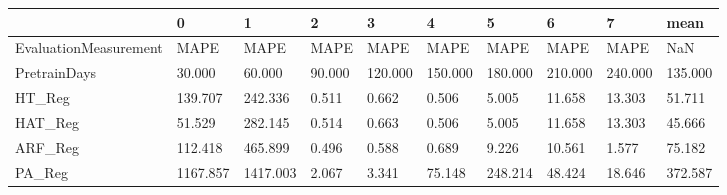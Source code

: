 \begin{tabular}{llllllllll}
\toprule
{} &        0 &        1 &      2 &       3 &       4 &       5 &       6 &       7 &    mean \\
\midrule
EvaluationMeasurement &     MAPE &     MAPE &   MAPE &    MAPE &    MAPE &    MAPE &    MAPE &    MAPE &     NaN \\
PretrainDays          &   30.000 &   60.000 & 90.000 & 120.000 & 150.000 & 180.000 & 210.000 & 240.000 & 135.000 \\
HT\_Reg                &  139.707 &  242.336 &  0.511 &   0.662 &   0.506 &   5.005 &  11.658 &  13.303 &  51.711 \\
HAT\_Reg               &   51.529 &  282.145 &  0.514 &   0.663 &   0.506 &   5.005 &  11.658 &  13.303 &  45.666 \\
ARF\_Reg               &  112.418 &  465.899 &  0.496 &   0.588 &   0.689 &   9.226 &  10.561 &   1.577 &  75.182 \\
PA\_Reg                & 1167.857 & 1417.003 &  2.067 &   3.341 &  75.148 & 248.214 &  48.424 &  18.646 & 372.587 \\
\bottomrule
\end{tabular}
